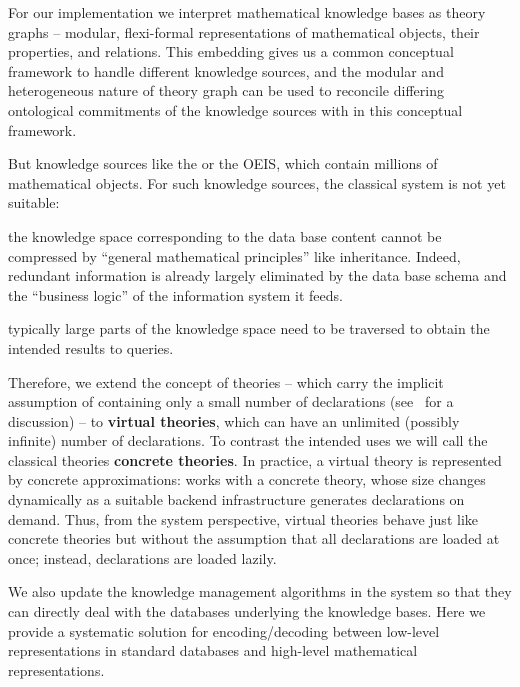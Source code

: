 For our implementation we interpret mathematical knowledge bases as \ommt theory graphs -- modular, flexi-formal representations of mathematical objects, their properties, and relations. 
This embedding gives us a common conceptual framework to handle different knowledge sources, and the modular and heterogeneous nature of \ommt theory graph can be used to reconcile differing ontological commitments of the knowledge sources with in this conceptual framework.


But knowledge sources like the \lmfdb or the OEIS, which contain millions of mathematical objects. For such knowledge sources, the classical \mmt system is not yet suitable:
\begin{compactitem}
\item the knowledge space corresponding to the data base content cannot be compressed by ``general mathematical principles'' like inheritance. 
Indeed, redundant information is already largely eliminated by the data base schema and the ``business logic'' of the information system it feeds.
\item typically large parts of the knowledge space need to be traversed to obtain the intended results to queries.
\end{compactitem}
Therefore, we extend the concept of \ommt theories -- which carry the implicit assumption of containing only a small number of declarations (see~\cite{FaGu:lt92} for a discussion) -- to \textbf{virtual theories}, which can have an unlimited (possibly infinite) number of declarations. 
To contrast the intended uses we will call the classical \ommt theories \textbf{concrete theories}.  
In practice, a virtual theory is represented by concrete approximations: \ommt works with
a concrete theory, whose size changes dynamically as a suitable backend infrastructure
generates declarations on demand.
Thus, from the system perspective, virtual theories behave just like concrete theories but without the assumption that all declarations are loaded at once; instead, declarations  are loaded lazily.

We also update the knowledge management algorithms in the \mmt system so that they can directly deal with the databases underlying the knowledge bases.
Here we provide a systematic solution for encoding/decoding between low-level representations in standard databases and high-level mathematical representations.


